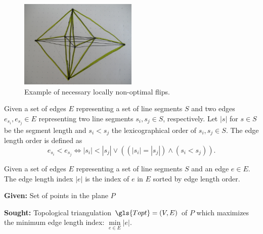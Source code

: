 \begin{figure}[ht]
  \centering
  \includegraphics[width=0.5\textwidth]{img/example_nonoptimal_flips.jpg}
  \caption{Example of necessary locally non-optimal flips.\label{fig:nonoptimal_flips}}
\end{figure}

\begin{definition}
  Given a set of edges \(E\) representing a set of line segments
  \(S\) and two edges \(e_{s_i}, e_{s_j} \in E\) representing two
  line segments \(s_i,s_j \in S\), respectively. Let \(|s|\) for
  \(s \in S\) be the segment length and \( s_i < s_j \) the
  lexicographical order of \(s_i, s_j \in S\). The edge length
  order is defined as  
  \[
    e_{s_i} < e_{s_j}
    \iff |s_i| < |s_j|
    \lor ((|s_i| = |s_j|) \land (s_i < s_j)).
  \]
\end{definition}

\begin{definition}
  Given a set of edges \(E\) representing a set of line segments
  \(S\) and an edge \(e \in E\). The edge length index \(|e|\) is the
  index of \(e\) in \(E\) sorted by edge length order.
\end{definition}


\begin{problem}
  \hfill
  \begin{labeling}{\hspace{4em}}
    \item[\textbf{Given:}]
      Set of points in the plane \(P\)
    \item[\textbf{Sought:}]
      Topological triangulation \(\gls{Topt} = (V,E)\) of \(P\)
      which maximizes the minimum edge length index: 
      \(\min\limits_{e\in E} |e|\).
  \end{labeling}
\end{problem}

